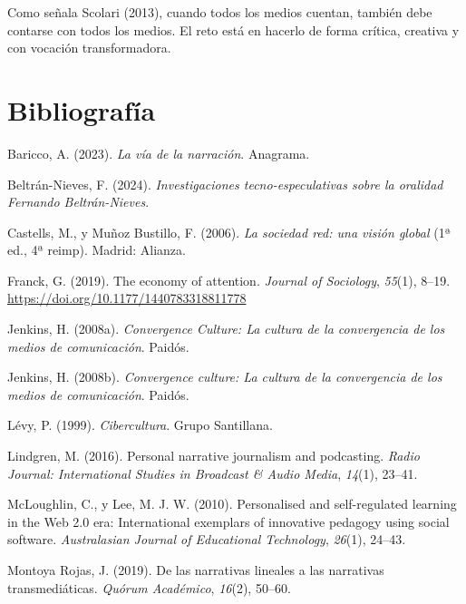 \documentclass[
]{interact}
\newlength{\cslhangindent}
\newenvironment{CSLReferences}[2] %
 {\begin{list}{}{%
  \setlength{\itemindent}{0pt}
  \setlength{\leftmargin}{0pt}
  \setlength{\parsep}{0pt}
  \ifodd #1
   \setlength{\leftmargin}{\cslhangindent}
   \setlength{\itemindent}{-1\cslhangindent}
  \fi
  \setlength{\itemsep}{#2\baselineskip}}}
 {\end{list}}
\begin{document}
Como señala Scolari (2013), cuando todos los medios cuentan, también
debe contarse con todos los medios. El reto está en hacerlo de forma
crítica, creativa y con vocación transformadora.

\section*{Bibliografía}\label{bibliografuxeda}

\label{refs}
\begin{CSLReferences}{1}{0}
Baricco, A. (2023). \emph{La v{í}a de la narraci{ó}n}. Anagrama.

Beltrán-Nieves, F. (2024). \emph{{Investigaciones tecno-especulativas
sobre la oralidad {\textbar} Fernando Beltr{á}n-Nieves}}.

Castells, M., y Muñoz Bustillo, F. (2006). \emph{{La sociedad red: una
visi{ó}n global}} (1ª ed., 4ª reimp). Madrid: Alianza.

Franck, G. (2019). The economy of attention. \emph{Journal of
Sociology}, \emph{55}(1), 8--19.
\url{https://doi.org/10.1177/1440783318811778}

Jenkins, H. (2008a). \emph{Convergence {Culture}: {La} cultura de la
convergencia de los medios de comunicaci{ó}n}. Paid{ó}s.

Jenkins, H. (2008b). \emph{Convergence culture: La cultura de la
convergencia de los medios de comunicación}. Paidós.

Lévy, P. (1999). \emph{Cibercultura}. Grupo Santillana.

Lindgren, M. (2016). Personal narrative journalism and podcasting.
\emph{Radio Journal: International Studies in Broadcast \& Audio Media},
\emph{14}(1), 23--41.

McLoughlin, C., y Lee, M. J. W. (2010). Personalised and self-regulated
learning in the {Web} 2.0 era: {International} exemplars of innovative
pedagogy using social software. \emph{Australasian Journal of
Educational Technology}, \emph{26}(1), 24--43.

Montoya Rojas, J. (2019). De las narrativas lineales a las narrativas
transmedi{á}ticas. \emph{Qu{ó}rum Acad{é}mico}, \emph{16}(2), 50--60.


\end{CSLReferences}
\end{document}
